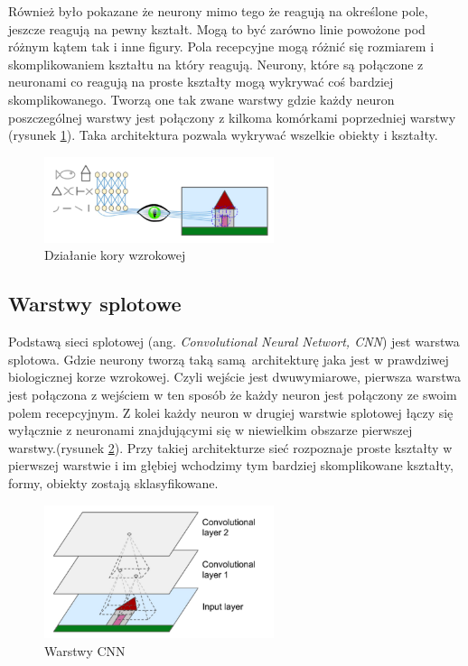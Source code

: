 \documentclass{article}
\begin{document}
Również było pokazane że neurony mimo tego że reagują na określone pole, jeszcze reagują na pewny kształt. Mogą to być zarówno linie powożone pod różnym kątem tak i inne figury. Pola recepcyjne mogą różnić się rozmiarem i skomplikowaniem kształtu na który reagują. Neurony, które są połączone z neuronami co reagują na proste kształty mogą wykrywać coś bardziej skomplikowanego. Tworzą one tak zwane warstwy gdzie każdy neuron poszczególnej warstwy jest połączony z kilkoma komórkami poprzedniej warstwy (rysunek \ref{kora_wzrokowa}). Taka architektura pozwala wykrywać wszelkie obiekty i kształty. \cite{geron}

\begin{figure}[H]
	\centering
	\includegraphics[width=0.6\textwidth,keepaspectratio=true]{kora_wzrokowa}
	\caption{Działanie kory wzrokowej \cite{geron}}
	\label{kora_wzrokowa}
\end{figure}

\subsection{Warstwy splotowe}
Podstawą sieci splotowej (ang. \textit{Convolutional Neural Networt, CNN}) jest warstwa splotowa. Gdzie neurony tworzą taką samą architekturę jaka jest w prawdziwej biologicznej korze wzrokowej. Czyli wejście jest dwuwymiarowe, pierwsza warstwa jest połączona z wejściem w ten sposób że każdy neuron jest połączony ze swoim polem recepcyjnym. Z kolei każdy neuron w drugiej warstwie splotowej łączy się wyłącznie z neuronami znajdującymi się w niewielkim obszarze pierwszej warstwy.(rysunek \ref{warstwa_splotowa}).
Przy takiej architekturze sieć rozpoznaje proste kształty w pierwszej warstwie i im głębiej wchodzimy tym bardziej skomplikowane kształty, formy, obiekty zostają sklasyfikowane. \cite{geron}

\begin{figure}[H]
	\centering
	\includegraphics[width=0.6\textwidth,keepaspectratio=true]{warstwa_splotowa}
	\caption{Warstwy CNN \cite{geron}}
	\label{warstwa_splotowa}
\end{figure}
\end{document}
